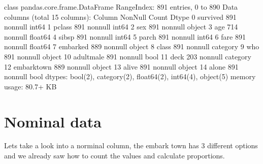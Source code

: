 \documentclass[letterpaper,10pt,english]{jupyterBook}
\begin{document}
\begin{sphinxVerbatim}[commandchars=\\\{\}]
\end{sphinxVerbatim}

\begin{sphinxVerbatim}[commandchars=\\\{\}]
\PYGZlt{}class \PYGZsq{}pandas.core.frame.DataFrame\PYGZsq{}\PYGZgt{}
RangeIndex: 891 entries, 0 to 890
Data columns (total 15 columns):
 \PYGZsh{}   Column       Non\PYGZhy{}Null Count  Dtype   
\PYGZhy{}\PYGZhy{}\PYGZhy{}  \PYGZhy{}\PYGZhy{}\PYGZhy{}\PYGZhy{}\PYGZhy{}\PYGZhy{}       \PYGZhy{}\PYGZhy{}\PYGZhy{}\PYGZhy{}\PYGZhy{}\PYGZhy{}\PYGZhy{}\PYGZhy{}\PYGZhy{}\PYGZhy{}\PYGZhy{}\PYGZhy{}\PYGZhy{}\PYGZhy{}  \PYGZhy{}\PYGZhy{}\PYGZhy{}\PYGZhy{}\PYGZhy{}   
 0   survived     891 non\PYGZhy{}null    int64   
 1   pclass       891 non\PYGZhy{}null    int64   
 2   sex          891 non\PYGZhy{}null    object  
 3   age          714 non\PYGZhy{}null    float64 
 4   sibsp        891 non\PYGZhy{}null    int64   
 5   parch        891 non\PYGZhy{}null    int64   
 6   fare         891 non\PYGZhy{}null    float64 
 7   embarked     889 non\PYGZhy{}null    object  
 8   class        891 non\PYGZhy{}null    category
 9   who          891 non\PYGZhy{}null    object  
 10  adult\PYGZus{}male   891 non\PYGZhy{}null    bool    
 11  deck         203 non\PYGZhy{}null    category
 12  embark\PYGZus{}town  889 non\PYGZhy{}null    object  
 13  alive        891 non\PYGZhy{}null    object  
 14  alone        891 non\PYGZhy{}null    bool    
dtypes: bool(2), category(2), float64(2), int64(4), object(5)
memory usage: 80.7+ KB
\end{sphinxVerbatim}


\section{Nominal data}
\label{\detokenize{c5_data_exploration/univariate_analysis:nominal-data}}
\sphinxAtStartPar
Lets take a look into a norminal column, the embark town has 3 different options and we already saw how to count the values and calculate proportions.

\begin{sphinxVerbatim}[commandchars=\\\{\}]
\PYG{p}{[}\PYG{p}{]}
\end{sphinxVerbatim}
\end{document}

